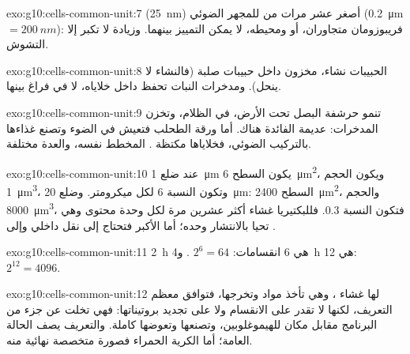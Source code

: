 \begin{solution}{exo:g10:cells-common-unit:7}
 (\qty{25}{nm}) أصغر عشر مرات من  للمجهر
الضوئي (\qty{0.2}{\micro m} $= \qty{200}{nm}$): فريبوزومان متجاوران،
أو  ومحيطه، لا يمكن التمييز بينهما. وزيادة  لا تكبر إلا
التشوش.
\end{solution}

\begin{solution}{exo:g10:cells-common-unit:8}
الحبيبات نشاء، مخزون داخل  حبيبات صلبة (فالنشاء لا ينحل).
ومدخرات النبات تحفظ داخل خلاياه، لا في فراغ بينها.
\end{solution}

\begin{solution}{exo:g10:cells-common-unit:9}
تنمو حرشفة البصل تحت الأرض، في الظلام، وتخزن المدخرات:  عديمة الفائدة هناك. أما ورقة الطحلب فتعيش في الضوء وتصنع
غذاءها بالتركيب الضوئي، فخلاياها مكتظة . المخطط
نفسه، والعدة مختلفة.
\end{solution}

\begin{solution}{exo:g10:cells-common-unit:10}
عند ضلع \qty{1}{\micro m} يكون السطح \qty{6}{\micro m^2}،
ويكون الحجم \qty{1}{\micro m^3}، وتكون النسبة 6 لكل ميكرومتر. وضلع \qty{20}{\micro m}:
السطح \qty{2400}{\micro m^2}، والحجم \qty{8000}{\micro m^3}، فتكون
النسبة 0.3. فللبكتيريا غشاء أكثر عشرين مرة لكل وحدة محتوى وهي تحيا بالانتشار
وحده؛ أما  الأكبر فتحتاج إلى نقل داخلي وإلى .
\end{solution}

\begin{solution}{exo:g10:cells-common-unit:11}
\qty{2}{h} هي 6 انقسامات: $2^6 = 64$ . و\qty{4}{h} هي 12:
$2^{12} = 4096$.
\end{solution}

\begin{solution}{exo:g10:cells-common-unit:12}
لها غشاء ، وهي تأخذ مواد وتخرجها، فتوافق معظم التعريف، لكنها
لا تقدر على الانقسام ولا على تجديد بروتيناتها: فهي  تخلت عن جزء من
البرنامج مقابل مكان للهيموغلوبين، وتصنعها وتعوضها  كاملة. والتعريف
يصف الحالة العامة؛ أما الكرية الحمراء فصورة متخصصة نهائية منه.
\end{solution}

